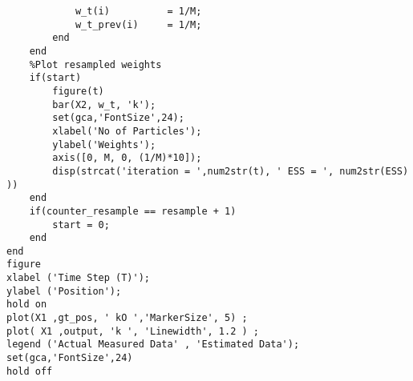 \documentclass[12pt]{article}
\begin{document}
\begin{verbatim}
            w_t(i)          = 1/M;
            w_t_prev(i)     = 1/M;
        end
    end
    %Plot resampled weights
    if(start)
        figure(t)
        bar(X2, w_t, 'k');
        set(gca,'FontSize',24);
        xlabel('No of Particles');
        ylabel('Weights');
        axis([0, M, 0, (1/M)*10]);
        disp(strcat('iteration = ',num2str(t), ' ESS = ', num2str(ESS) ))
    end
    if(counter_resample == resample + 1)
        start = 0;
    end
end
figure
xlabel ('Time Step (T)');
ylabel ('Position');
hold on
plot(X1 ,gt_pos, ' kO ','MarkerSize', 5) ;
plot( X1 ,output, 'k ', 'Linewidth', 1.2 ) ;
legend ('Actual Measured Data' , 'Estimated Data');
set(gca,'FontSize',24)
hold off
\end{verbatim}
\end{document}
